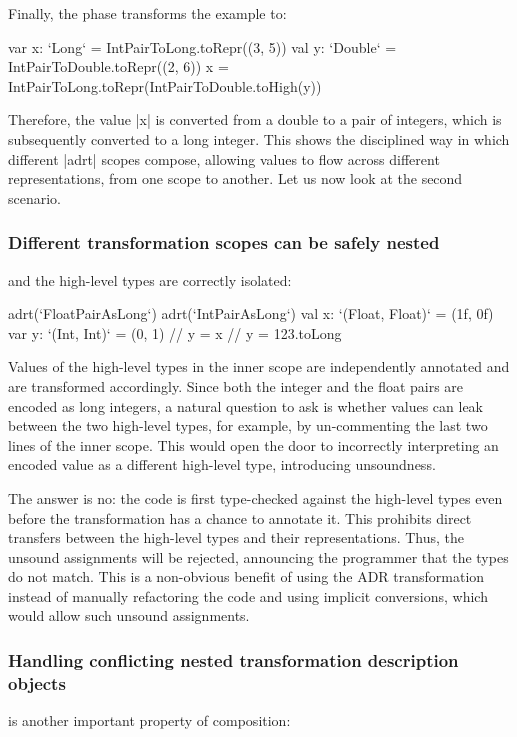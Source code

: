 Finally, the \commit{} phase transforms the example to:

\begin{lstlisting-nobreak}
var x: `Long` = IntPairToLong.toRepr((3, 5))
val y: `Double` = IntPairToDouble.toRepr((2, 6))
x = IntPairToLong.toRepr(IntPairToDouble.toHigh(y))
\end{lstlisting-nobreak}

Therefore, the value |x| is converted from a double to a pair of integers, which is subsequently converted to a long integer. This shows the disciplined way in which different |adrt| scopes compose, allowing values to flow across different representations, from one scope to another. Let us now look at the second scenario.

\subsubsection{Different transformation scopes can be safely nested} and the high-level types are correctly isolated:

\begin{lstlisting-nobreak}
adrt(`FloatPairAsLong`) {
  adrt(`IntPairAsLong`) {
    val x: `(Float, Float)` = (1f, 0f)
    var y: `(Int, Int)` = (0, 1)
    // y = x
    // y = 123.toLong
  }
}
\end{lstlisting-nobreak}

Values of the high-level types in the inner scope are independently annotated and are transformed accordingly. Since both the integer and the float pairs are encoded as long integers, a natural question to ask is whether values can leak between the two high-level types, for example, by un-commenting the last two lines of the inner scope. This would open the door to incorrectly interpreting an encoded value as a different high-level type, introducing unsoundness.

The answer is no: the code is first type-checked against the high-level types even before the \inject{} transformation has a chance to annotate it. This prohibits direct transfers between the high-level types and their representations. Thus, the unsound assignments will be rejected, announcing the programmer that the types do not match. This is a non-obvious benefit of using the ADR transformation instead of manually refactoring the code and using implicit conversions, which would allow such unsound assignments.

\subsubsection{Handling conflicting nested transformation description objects} is another important property of composition:

